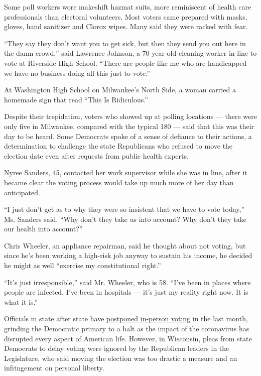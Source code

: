 Some poll workers wore makeshift hazmat suits, more reminiscent of
health care professionals than electoral volunteers. Most voters came
prepared with masks, gloves, hand sanitizer and Clorox wipes. Many said
they were racked with fear.

``They say they don't want you to get sick, but then they send you out
here in the damn crowd,'' said Lawrence Johnson, a 70-year-old cleaning
worker in line to vote at Riverside High School. ``There are people like
me who are handicapped --- we have no business doing all this just to
vote.''

At Washington High School on Milwaukee's North Side, a woman carried a
homemade sign that read ``This Is Ridiculous.''

Despite their trepidation, voters who showed up at polling locations ---
there were only five in Milwaukee, compared with the typical 180 ---
said that this was their day to be heard. Some Democrats spoke of a
sense of defiance to their actions, a determination to challenge the
state Republicans who refused to move the election date even after
requests from public health experts.

Nyree Sanders, 45, contacted her work supervisor while she was in line,
after it became clear the voting process would take up much more of her
day than anticipated.

``I just don't get as to why they were so insistent that we have to vote
today,'' Ms. Sanders said. ``Why don't they take us into account? Why
don't they take our health into account?''

Chris Wheeler, an appliance repairman, said he thought about not voting,
but since he's been working a high-risk job anyway to sustain his
income, he decided he might as well ``exercise my constitutional
right.''

``It's just irresponsible,'' said Mr. Wheeler, who is 58. ``I've been in
places where people are infected, I've been in hospitals --- it's just
my reality right now. It is what it is.''

Officials in state after state have
\href{https://www.nytimes3xbfgragh.onion/article/2020-campaign-primary-calendar-coronavirus.html}{postponed
in-person voting} in the last month, grinding the Democratic primary to
a halt as the impact of the coronavirus has disrupted every aspect of
American life. However, in Wisconsin, pleas from state Democrats to
delay voting were ignored by the Republican leaders in the Legislature,
who said moving the election was too drastic a measure and an
infringement on personal liberty.

